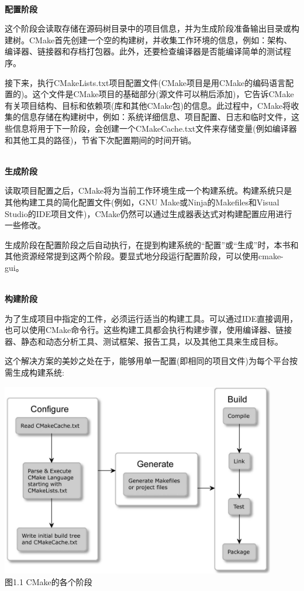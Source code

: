 \hspace*{\fill} \\ %
\noindent
\textbf{配置阶段}

这个阶段会读取存储在源码树目录中的项目信息，并为生成阶段准备输出目录或构建树。CMake首先创建一个空的构建树，并收集工作环境的信息，例如：架构、编译器、链接器和存档打包器。此外，还要检查编译器是否能编译简单的测试程序。

接下来，执行CMakeLists.txt项目配置文件(CMake项目是用CMake的编码语言配置的)。这个文件是CMake项目的基础部分(源文件可以稍后添加)，它告诉CMake有关项目结构、目标和依赖项(库和其他CMake包)的信息。此过程中，CMake将收集的信息存储在构建树中，例如：系统详细信息、项目配置、日志和临时文件，这些信息将用于下一阶段，会创建一个CMakeCache.txt文件来存储变量(例如编译器和其他工具的路径)，节省下次配置期间的时间开销。

\hspace*{\fill} \\ %
\noindent
\textbf{生成阶段}

读取项目配置之后，CMake将为当前工作环境生成一个构建系统。构建系统只是其他构建工具的简化配置文件(例如，GNU Make或Ninja的Makefiles和Visual Studio的IDE项目文件)，CMake仍然可以通过生成器表达式对构建配置应用进行一些修改。

\begin{tcolorbox}[colback=blue!5!white,colframe=blue!75!black,title=Note]
生成阶段在配置阶段之后自动执行，在提到构建系统的“配置”或“生成”时，本书和其他资源经常提到这两个阶段。要显式地分段运行配置阶段，可以使用cmake-gui。
\end{tcolorbox}

\hspace*{\fill} \\ %
\noindent
\textbf{构建阶段}

为了生成项目中指定的工件，必须运行适当的构建工具。可以通过IDE直接调用，也可以使用CMake命令行。这些构建工具都会执行构建步骤，使用编译器、链接器、静态和动态分析工具、测试框架、报告工具，以及其他工具来生成目标。

这个解决方案的美妙之处在于，能够用单一配置(即相同的项目文件)为每个平台按需生成构建系统:

\begin{center}
\includegraphics[width=0.9\textwidth]{content/1/chapter1/images/1.jpg}\\
图1.1  CMake的各个阶段
\end{center}

